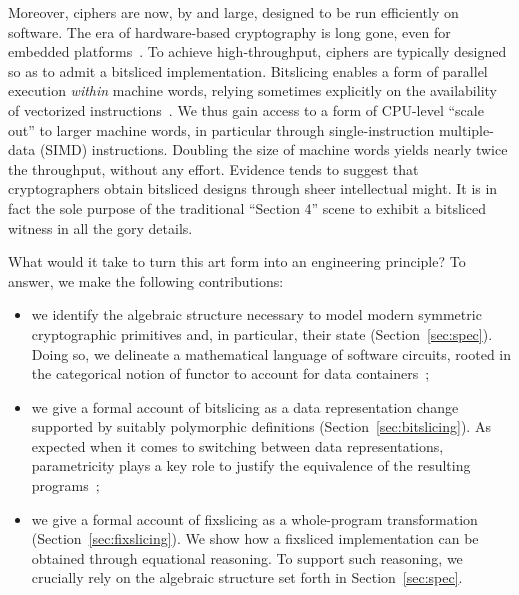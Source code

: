 \documentclass[draft,english]{jflart}
\begin{document}
Moreover, ciphers are now, by and large, designed to be run
efficiently on software. The era of hardware-based cryptography is
long gone, even for embedded
platforms~\citep{buchanan:nist-lightweight-crypto}. To achieve
high-throughput, ciphers are typically designed so as to admit a
bitsliced implementation. Bitslicing enables a form of parallel
execution \emph{within} machine words, relying sometimes explicitly on
the availability of vectorized instructions~\citep{beaulieu:speck,
  bernstein:chacha}. We thus gain access to a form of CPU-level
``scale out'' to larger machine words, in particular through
single-instruction multiple-data (SIMD) instructions. Doubling the
size of machine words yields nearly twice the throughput, without any
effort. Evidence tends to suggest that cryptographers obtain bitsliced
designs through sheer intellectual might. It is in fact the sole
purpose of the traditional ``Section 4'' scene to exhibit a bitsliced
witness in all the gory details.


What would it take to turn this art form into an engineering
principle? To answer, we make the following contributions:
%
\begin{itemize}
\item we identify the algebraic structure necessary to model modern
  symmetric cryptographic primitives and, in particular, their state
  (Section~\ref{sec:spec}). Doing so, we delineate a mathematical
  language of software circuits, rooted in the categorical notion of
  functor to account for data containers~;
\item we give a formal account of bitslicing as a data representation
  change supported by suitably polymorphic definitions
  (Section~\ref{sec:bitslicing}). As expected when it comes to
  switching between data representations, parametricity plays a key
  role to justify the equivalence of the resulting programs~;
\item we give a formal account of fixslicing as a whole-program
  transformation (Section~\ref{sec:fixslicing}). We show how a
  fixsliced implementation can be obtained through equational
  reasoning. To support such reasoning, we crucially rely on the
  algebraic structure set forth in Section~\ref{sec:spec}.
\end{itemize}
\end{document}
